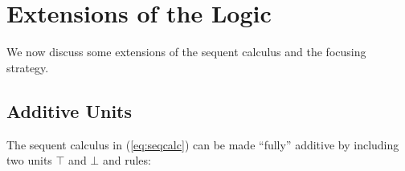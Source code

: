 \documentclass[submission,copyright,creativecommons]{eptcs}
\theoremstyle{definition}
\newcommand\cheng[1]{\mbox{}
{\marginpar{\color{blue}CSW}}
{\sf\noindent\color{blue}#1}}%
\begin{document}
\section{Extensions of the Logic}\label{sec:extensions}
We now discuss some extensions of the sequent calculus and the focusing strategy.

\subsection{Additive Units}\label{subsec:AddUnits}

The sequent calculus in (\ref{eq:seqcalc}) can be made ``fully'' additive by including two units $\top$ and $\bot$ %
and rules:
\end{document}
